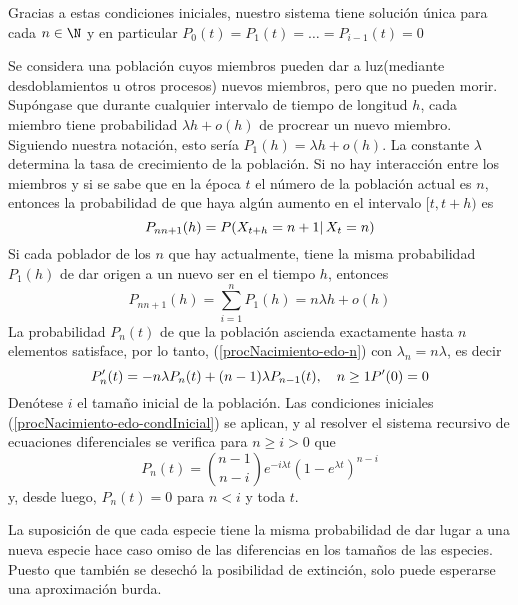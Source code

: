 Gracias a estas condiciones iniciales, nuestro sistema tiene solución única para cada $n\in\N$ y en particular $P_0(t)=P_1(t)=\ldots=P_{i-1}(t)=0$
\begin{Ejm}
    Se considera una población cuyos miembros pueden dar a luz(mediante desdoblamientos u otros procesos) nuevos miembros, pero que no pueden morir. Supóngase que durante cualquier intervalo de tiempo de longitud $h$, cada miembro tiene probabilidad $\lambda h + o(h)$ de procrear un nuevo miembro. Siguiendo nuestra notación, esto sería $P_1(h)=\lambda h + o(h)$. La constante $\lambda$ determina la tasa de crecimiento de la población. Si no hay interacción entre los miembros y si se sabe que en la época $t$ el número de la población actual es $n$, entonces la probabilidad de que haya algún aumento en el intervalo $[t,t+h)$  es $$P_{n n+1}(h)=P(X_{t+h}=n+1|\thinspace X_t=n)$$
    Si cada poblador de los $n$ que hay actualmente, tiene la misma probabilidad $P_1(h)$ de dar origen a un nuevo ser en el tiempo $h$, entonces
    $$P_{n n+1}(h)=\sum_{i=1}^n P_1(h)= n\lambda h + o(h)$$
    La probabilidad $P_n(t)$ de que la población ascienda exactamente hasta $n$ elementos satisface, por lo tanto, (\ref{procNacimiento-edo-n}) con $\lambda_n= n\lambda$, es decir $$ P'_n(t)=-n\lambda P_n(t)+(n-1)\lambda P_{n-1}(t),\quad n\geq 1\\P'(0)=0$$
    Denótese $i$ el tamaño inicial de la población.
    Las condiciones iniciales (\ref{procNacimiento-edo-condInicial}) se aplican, y al resolver el sistema recursivo de ecuaciones diferenciales se verifica para $n\geq i>0$ que 
    $$P_n(t)={ n-1 \choose n-i}e^{-i\lambda t}(1-e^{\lambda t})^{n-i}$$
    y, desde luego, $P_n(t)=0$ para $n<i$ y toda $t$.
\end{Ejm}
La suposición de que cada especie tiene la misma probabilidad de dar lugar a una nueva especie hace caso omiso de las diferencias en los tamaños de las especies. Puesto que también se desechó la posibilidad de extinción, solo puede esperarse una aproximación burda.